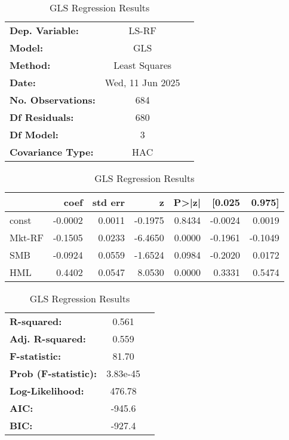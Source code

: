 \begin{table}[htbp]
\centering
\caption{GLS Regression Results}
\begin{tabular}{lcl}
\toprule
\textbf{Dep. Variable:} & LS-RF & \\
\textbf{Model:} & GLS & \\
\textbf{Method:} & Least Squares & \\
\textbf{Date:} & Wed, 11 Jun 2025 & \\
\textbf{No. Observations:} & 684 & \\
\textbf{Df Residuals:} & 680 & \\
\textbf{Df Model:} & 3 & \\
\textbf{Covariance Type:} & HAC & \\
\bottomrule
\end{tabular}
\vspace{0.5em}
\begin{tabular}{lrrrrrr}
\toprule
 & coef & std err & z & P>|z| & [0.025 & 0.975] \\
\midrule
const & -0.0002 & 0.0011 & -0.1975 & 0.8434 & -0.0024 & 0.0019 \\
Mkt-RF & -0.1505 & 0.0233 & -6.4650 & 0.0000 & -0.1961 & -0.1049 \\
SMB & -0.0924 & 0.0559 & -1.6524 & 0.0984 & -0.2020 & 0.0172 \\
HML & 0.4402 & 0.0547 & 8.0530 & 0.0000 & 0.3331 & 0.5474 \\
\bottomrule
\end{tabular}

\begin{tabular}{lcl}
\toprule
\textbf{R-squared:} & 0.561 & \\
\textbf{Adj. R-squared:} & 0.559 & \\
\textbf{F-statistic:} & 81.70 & \\
\textbf{Prob (F-statistic):} & 3.83e-45 & \\
\textbf{Log-Likelihood:} & 476.78 & \\
\textbf{AIC:} & -945.6 & \\
\textbf{BIC:} & -927.4 & \\
\bottomrule
\end{tabular}
\end{table}